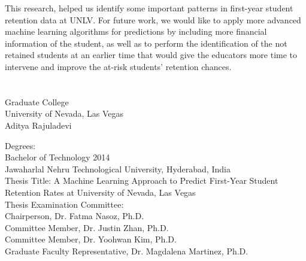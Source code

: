 \documentclass[11pt,openright]{report}
\begin{document}
This research, helped us identify some important patterns in first-year student retention data at UNLV. For future work, we would like to apply more advanced machine learning algorithms for predictions by including more financial information of the student, as well as to perform the identification of the not retained students at an earlier time that would give the educators more time to intervene and improve the at-risk students' retention chances.





\vita
\chapter{} %
\linespread{1.3} 
\begin{center}
Graduate College\\
University of Nevada, Las Vegas\\[1cm]
Aditya Rajuladevi\\[1cm]
\end{center}

\noindent Degrees:\\
\indent Bachelor of Technology 2014\\
\indent Jawaharlal Nehru Technological University, Hyderabad, India\\

\noindent Thesis Title: A Machine Learning Approach to Predict First-Year Student Retention Rates at University of Nevada, Las Vegas\\

\noindent Thesis Examination Committee:\\
\indent Chairperson, Dr. Fatma Nasoz, Ph.D.\\
\indent Committee Member, Dr. Justin Zhan, Ph.D.\\
\indent Committee Member, Dr. Yoohwan Kim, Ph.D.\\
\indent Graduate Faculty Representative, Dr. Magdalena Martinez, Ph.D.\\
\end{document}
